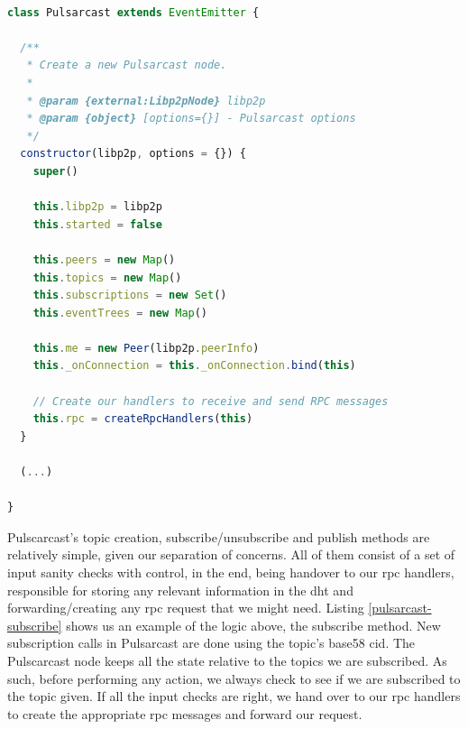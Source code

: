 \begin{lstlisting}[language=JavaScript, float, caption={Pulsarcast constructor},label={pulsarcast-constructor}]

class Pulsarcast extends EventEmitter {

  /**
   * Create a new Pulsarcast node.
   *
   * @param {external:Libp2pNode} libp2p
   * @param {object} [options={}] - Pulsarcast options
   */
  constructor(libp2p, options = {}) {
    super()

    this.libp2p = libp2p
    this.started = false

    this.peers = new Map()
    this.topics = new Map()
    this.subscriptions = new Set()
    this.eventTrees = new Map()

    this.me = new Peer(libp2p.peerInfo)
    this._onConnection = this._onConnection.bind(this)

    // Create our handlers to receive and send RPC messages
    this.rpc = createRpcHandlers(this)
  }

  (...)

}
\end{lstlisting}

Pulscarcast's topic creation, subscribe/unsubscribe and publish methods are
relatively simple, given our separation of concerns. All of them consist of a
set of input sanity checks with control, in the end, being handover to our
\acrshort{rpc} handlers, responsible for storing any relevant information in
the \acrshort{dht} and forwarding/creating any \acrshort{rpc} request that we
might need. Listing \ref{pulsarcast-subscribe} shows us an example of the logic
above, the subscribe method. New subscription calls in Pulsarcast are done
using the topic's base58 \acrshort{cid}. The Pulscarcast node keeps all the
state relative to the topics we are subscribed. As such, before performing any
action, we always check to see if we are subscribed to the topic given. If all
the input checks are right, we hand over to our \acrshort{rpc} handlers to
create the appropriate \acrshort{rpc} messages and forward our request.

